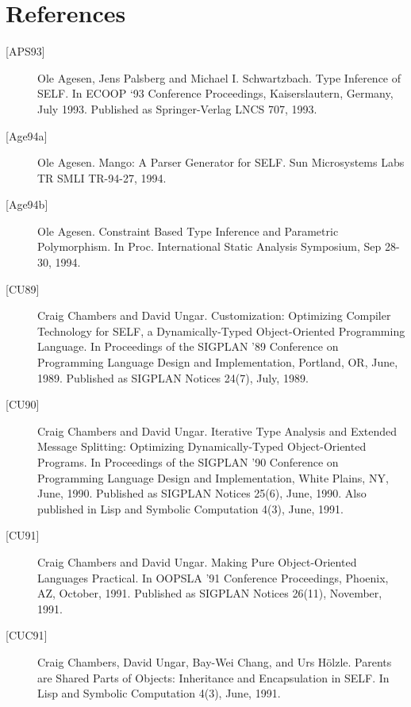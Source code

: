\documentclass[letterpaper,10pt,english]{sphinxmanual}
\begin{document}

\chapter{References}
\label{\detokenize{ref:references}}\label{\detokenize{ref:citations}}\label{\detokenize{ref::doc}}\begin{description}
\item[{{[}APS93{]}}] \leavevmode
Ole Agesen, Jens Palsberg and Michael I. Schwartzbach. Type Inference of SELF. In ECOOP ‘93 Conference Proceedings, Kaiserslautern, Germany, July 1993. Published as Springer-Verlag LNCS 707, 1993.

\item[{{[}Age94a{]}}] \leavevmode
Ole Agesen. Mango: A Parser Generator for SELF. Sun Microsystems Labs TR SMLI TR-94-27, 1994.

\item[{{[}Age94b{]}}] \leavevmode
Ole Agesen. Constraint Based Type Inference and Parametric Polymorphism. In Proc. International Static Analysis Symposium, Sep 28-30, 1994.

\item[{{[}CU89{]}}] \leavevmode
Craig Chambers and David Ungar. Customization: Optimizing Compiler Technology for SELF, a Dynamically-Typed Object-Oriented Programming Language. In Proceedings of the SIGPLAN ’89 Conference on Programming Language Design and Implementation, Portland, OR, June, 1989. Published as SIGPLAN Notices 24(7), July, 1989.

\item[{{[}CU90{]}}] \leavevmode
Craig Chambers and David Ungar. Iterative Type Analysis and Extended Message Splitting: Optimizing Dynamically-Typed Object-Oriented Programs. In Proceedings of the SIGPLAN ’90 Conference on Programming Language Design and Implementation, White Plains, NY, June, 1990. Published as SIGPLAN Notices 25(6), June, 1990. Also published in Lisp and Symbolic Computation 4(3), June, 1991.

\item[{{[}CU91{]}}] \leavevmode
Craig Chambers and David Ungar. Making Pure Object-Oriented Languages Practical. In OOPSLA ’91 Conference Proceedings, Phoenix, AZ, October, 1991. Published as SIGPLAN Notices 26(11), November, 1991.

\item[{{[}CUC91{]}}] \leavevmode
Craig Chambers, David Ungar, Bay-Wei Chang, and Urs Hölzle. Parents are Shared Parts of Objects: Inheritance and Encapsulation in SELF. In Lisp and Symbolic Computation 4(3), June, 1991.


\end{description}
\end{document}
